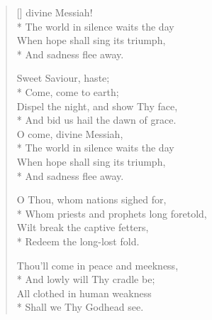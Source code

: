 \newHymn


\begin{verse}[\versewidth]
 divine Messiah!\\*
The world in silence waits the day\\
When hope shall sing its triumph,\\*
And sadness flee away.

 Sweet Saviour, haste;\\*
Come, come to earth;\\
Dispel the night, and show Thy face,\\*
And bid us hail the dawn of grace.\\
O come, divine Messiah,\\*
The world in silence waits the day\\
When hope shall sing its triumph,\\*
And sadness flee away.

O Thou, whom nations sighed for,\\*
Whom priests and prophets long foretold,\\
Wilt break the captive fetters,\\*
Redeem the long-lost fold.

Thou'll come in peace and meekness,\\*
And lowly will Thy cradle be;\\
All clothed in human weakness\\*
Shall we Thy Godhead see.

\end{verse}



